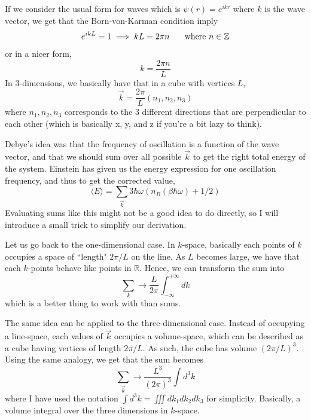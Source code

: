 \documentclass[12pt]{article}
\begin{document}
\vspace{0.25 in}

If we consider the usual form for waves which is  $\psi(r)=e^{ikr}$ where $k$ is the wave vector, we get that the Born-von-Karman condition imply
\begin{equation*}
    e^{ikL}=1\implies kL=2\pi n\text{\hspace{0.25 in}where $n\in\mathbb{Z}$}
\end{equation*}
or in a nicer form,
\begin{equation*}
    k=\frac{2\pi n}{L}
\end{equation*}
In 3-dimensions, we basically have that in a cube with vertices $L$,
\begin{equation*}
    \vec{k}=\frac{2\pi}{L}(n_1,n_2,n_3)
\end{equation*}
where $n_1,n_2,n_3$ corresponds to the 3 different  directions that are perpendicular to each other (which is basically x, y, and z if you're a bit lazy to think).

\vspace{0.25 in}

Debye's idea was that the frequency of oscillation is a function of the wave vector, and that we should sum over all possible $\vec{k}$ to get the right total energy of the system. Einstein has given us the energy expression for one oscillation frequency, and thus to get the corrected value,
\begin{equation*}
    \langle E\rangle=\sum_{\vec{k}}3\hbar\omega(n_B(\beta\hbar\omega)+1/2)
\end{equation*}
Evaluating sums like this might not be a good idea to do directly, so I will introduce a small trick to simplify our derivation.

\newpage

Let us go back to the one-dimensional case. In $k$-space, basically each points of $k$ occupies a space of ``length" $2\pi /L$ on the line. As $L$ becomes large, we have that each $k$-points behave like points in $\mathbb{R}$. Hence, we can transform the sum into
\begin{equation*}
    \sum_{k}\rightarrow\frac{L}{2\pi}\int_{-\infty}^{+\infty}dk
\end{equation*}
which is a better thing to work with than sums.

\vspace{0.25 in}

The same idea can be applied to the three-dimensional case. Instead of occupying a line-space, each values of $\vec{k}$ occupies a volume-space, which can be described as a cube having vertices of length $2\pi /L$. As such, the cube has volume $(2\pi / L)^3$. Using the same analogy, we get that the sum becomes
\begin{equation*}
    \sum_{\vec{k}}\rightarrow\frac{L^3}{(2\pi)^3}\int d^3k
\end{equation*}
where I have used the notation $\int d^3k=\iiint dk_1dk_2dk_3$ for simplicity. Basically, a volume integral over the three dimensions in $k$-space.
\end{document}
